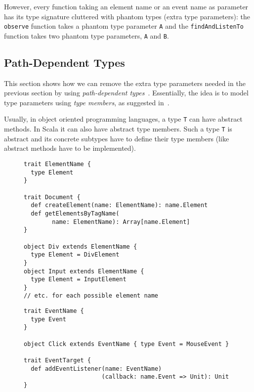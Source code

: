 \documentclass{llncs}
\newcommand{\jscode}[1]{\lstinline[language=JavaScript]|#1|}
\newcommand{\scalacode}[1]{\lstinline[language=Scala]|#1|}
\begin{document}
However, every function taking an element name or an event name as parameter has its type signature cluttered with phantom types (extra type parameters): the \scalacode{observe} function takes a phantom type parameter \scalacode{A} and the \scalacode{findAndListenTo} function takes two phantom type parameters, \scalacode{A} and \scalacode{B}.

\subsection{Path-Dependent Types}

This section shows how we can remove the extra type parameters needed in the previous section by using \emph{path-dependent types}~\cite{Odersky03_vObj}. Essentially, the idea is to model type parameters using \emph{type members}, as suggested in~\cite{odersky2005scalable}.

Usually, in object oriented programming languages, a type \scalacode{T} can have abstract methods. In Scala it can also have abstract type members. Such a type \scalacode{T} is abstract and its concrete subtypes have to define their type members (like abstract methods have to be implemented).

\begin{figure}
\begin{lstlisting}[label=lst-dt-dom,caption={Encoding of \jscode{createElement} using path-dependent types}]
trait ElementName {
  type Element
}

trait Document {
  def createElement(name: ElementName): name.Element
  def getElementsByTagName(
        name: ElementName): Array[name.Element]
}

object Div extends ElementName {
  type Element = DivElement
}
object Input extends ElementName {
  type Element = InputElement
}
// etc. for each possible element name
\end{lstlisting}
\end{figure}

\begin{figure}
\begin{lstlisting}[label=lst-dt-events,caption={Encoding of \jscode{addEventListener} using path-dependent types}]
trait EventName {
  type Event
}

object Click extends EventName { type Event = MouseEvent }

trait EventTarget {
  def addEventListener(name: EventName)
                      (callback: name.Event => Unit): Unit
}
\end{lstlisting}
\end{figure}
\end{document}
